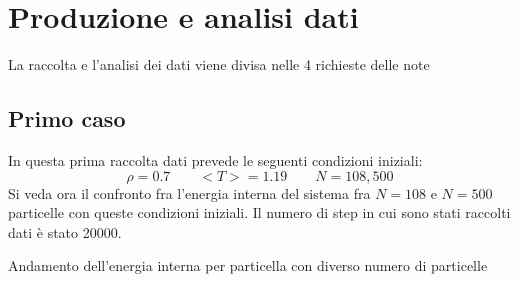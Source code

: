 \section{Produzione e analisi dati}
La raccolta e l'analisi dei dati viene divisa nelle 4 richieste delle note
\subsection{Primo caso}
In questa prima raccolta dati prevede le seguenti condizioni iniziali:
$$
	\rho = 0.7 \qquad <T>=1.19 \qquad N=108,500
$$
Si veda ora il confronto fra l'energia interna del sistema fra $N=108$ e $N=500$ particelle con queste condizioni iniziali.
Il numero di step in cui sono stati raccolti dati è stato 20000.
\begin{myfig}[h]
	\caption{Andamento dell'energia interna per particella con diverso numero di particelle}
\end{myfig}

